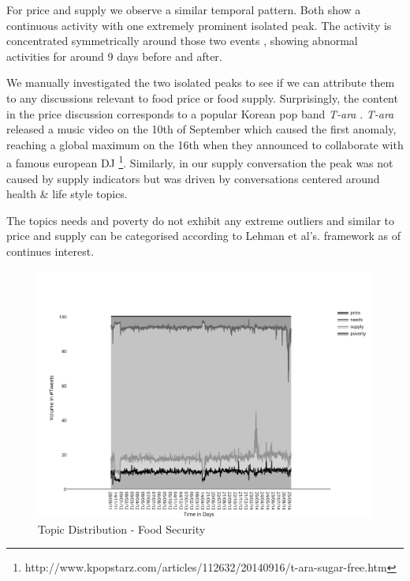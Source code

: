 For price and supply we observe a similar temporal pattern. Both show a continuous activity with one extremely prominent isolated peak. The activity is concentrated symmetrically around those two events , showing abnormal activities for around 9 days before and after. 

 We manually investigated the two isolated peaks to see if we can attribute them to any discussions relevant to food price or food supply. Surprisingly, the content in the price discussion corresponds to a popular Korean pop band \emph{T-ara }. \emph{T-ara } released a music video on the 10th of September which caused the first anomaly, reaching a global maximum on the 16th when they announced to collaborate with a famous european DJ  \footnote{http://www.kpopstarz.com/articles/112632/20140916/t-ara-sugar-free.htm}. Similarly, in our supply conversation the peak was not caused by supply indicators but was driven by conversations centered around health \& life style topics. 

The topics needs and poverty do not exhibit any extreme outliers and similar to price and supply can be categorised according to Lehman et al's. framework as of continues interest. 




\begin{figure}[H]
        \centering
         \includegraphics[width=1\textwidth ]{img/anal/topic_dist}
              
        \caption{Topic Distribution - Food Security}
        \label{fig:topic_dist}
\end{figure}




